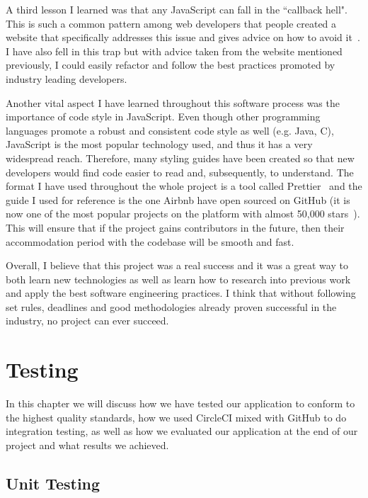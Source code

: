 \documentclass{l4proj}
\begin{document}
A third lesson I learned was that any JavaScript can fall in the ``callback hell". This is such a common pattern among
web developers that people created a website that specifically addresses this issue and gives advice on how to avoid
it~\cite{callback-hell}. I have also fell in this trap but with advice taken from the website mentioned previously, I
could easily refactor and follow the best practices promoted by industry leading developers.

Another vital aspect I have learned throughout this software process was the importance of code style in JavaScript. Even
though other programming languages promote a robust and consistent code style as well (e.g. Java, C), JavaScript is the
most popular technology used, and thus it has a very widespread reach. Therefore, many styling guides have been created so
that new developers would find code easier to read and, subsequently, to understand. The format I have used throughout
the whole project is a tool called Prettier~\cite{prettier} and the guide I used for reference is the one Airbnb have
open sourced on GitHub (it is now one of the most popular projects on the platform with almost 50,000
stars~\cite{airbnb-style-guide}). This will ensure that if the project gains contributors in the future, then their
accommodation period with the codebase will be smooth and fast.

Overall, I believe that this project was a real success and it was a great way to both learn new technologies as well as
learn how to research into previous work and apply the best software engineering practices. I think that without
following set rules, deadlines and good methodologies already proven successful in the industry, no project can ever
succeed.


\chapter{Testing}
\label{testing}

In this chapter we will discuss how we have tested our application to conform to the highest quality standards, how we used
CircleCI mixed with GitHub to do integration testing, as well as how we evaluated our application at the end of our
project and what results we achieved.

\section{Unit Testing}
\end{document}
